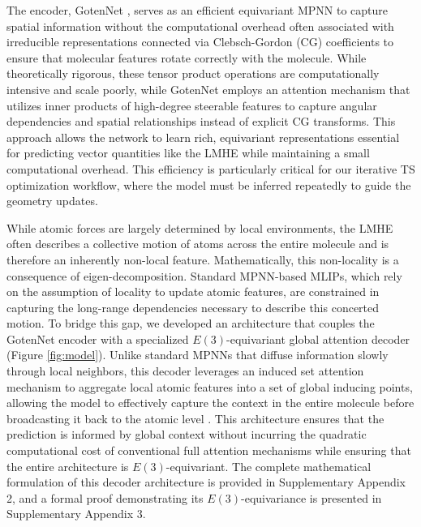 \documentclass[12pt]{article}
\begin{document}
The encoder, GotenNet \cite{GotenNet}, serves as an efficient equivariant MPNN to capture spatial information without the computational overhead often associated with irreducible representations connected via Clebsch-Gordon (CG) coefficients to ensure that molecular features rotate correctly with the molecule. While theoretically rigorous, these tensor product operations are computationally intensive and scale poorly, while GotenNet employs an attention mechanism that utilizes inner products of high-degree steerable features to capture angular dependencies and spatial relationships instead of explicit CG transforms. This approach allows the network to learn rich, equivariant representations essential for predicting vector quantities like the LMHE while maintaining a small computational overhead. This efficiency is particularly critical for our iterative TS optimization workflow, where the model must be inferred repeatedly to guide the geometry updates.\par

While atomic forces are largely determined by local environments, the LMHE often describes a collective motion of atoms across the entire molecule and is therefore an inherently non-local feature. Mathematically, this non-locality is a consequence of eigen-decomposition. Standard MPNN-based MLIPs, which rely on the assumption of locality to update atomic features, are constrained in capturing the long-range dependencies necessary to describe this concerted motion. To bridge this gap, we developed an architecture that couples the GotenNet encoder with a specialized $E(3)$-equivariant global attention decoder (Figure \ref{fig:model}). Unlike standard MPNNs that diffuse information slowly through local neighbors, this decoder leverages an induced set attention mechanism to aggregate local atomic features into a set of global inducing points, allowing the model to effectively capture the context in the entire molecule before broadcasting it back to the atomic level \cite{SetTransfromer}. This architecture ensures that the prediction is informed by global context without incurring the quadratic computational cost of conventional full attention mechanisms while ensuring that the entire architecture is $E(3)$-equivariant. The complete mathematical formulation of this decoder architecture is provided in Supplementary Appendix 2, and a formal proof demonstrating its $E(3)$-equivariance is presented in Supplementary Appendix 3. 
\end{document}
